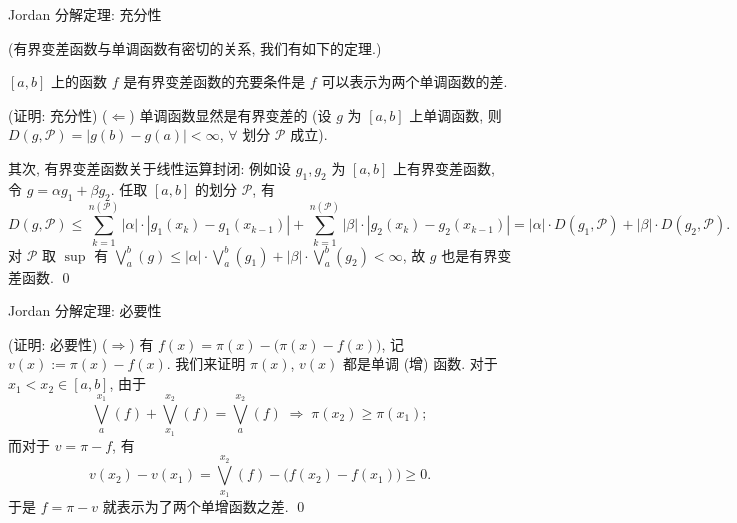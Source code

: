 \begin{frame}{Jordan 分解定理: 充分性}

(有界变差函数与单调函数有密切的关系, 我们有如下的定理.)

\begin{thm}[Jordan 分解]
$[a, b]$ 上的函数 $f$ 是有界变差函数的\alert{充要条件}是 $f$ 可以表示为两个单调函数的差.
\end{thm}

\startproof[bg=yellow, fg=red](证明: 充分性)
($\Longleftarrow$) 单调函数显然是有界变差的 (设 $g$ 为 $[a, b]$ 上单调函数, 则
$D(g, \mathscr{P}) = |g(b) - g(a)| < \infty$, $\forall$ 划分 $\mathscr{P}$ 成立).

其次, 有界变差函数关于线性运算封闭: 例如设 $g_1, g_2$ 为 $[a, b]$ 上有界变差函数,
令 $g = \alpha g_1 + \beta g_2$. 任取 $[a, b]$ 的划分 $\mathscr{P}$, 有
\[
D(g, \mathscr{P})
\leqslant \sum_{k=1}^{n(\mathscr{P})} |\alpha| \cdot
|g_1(x_k) - g_1(x_{k-1})|
+ \sum_{k=1}^{n(\mathscr{P})} |\beta| \cdot
|g_2(x_k) - g_2(x_{k-1})|
= |\alpha| \cdot D(g_1, \mathscr{P}) + |\beta| \cdot D(g_2, \mathscr{P}) .
\]
对 $\mathscr{P}$ 取 $\sup$ 有
$\bigvee_a^b (g) \leqslant |\alpha| \cdot \bigvee_a^b (g_1) + |\beta| \cdot \bigvee_a^b (g_2) < \infty$,
故 $g$ 也是有界变差函数.
\qed

\end{frame}


\begin{frame}{Jordan 分解定理: 必要性}

\startproof[bg=yellow, fg=red](证明: 必要性)
($\Longrightarrow$) 有
$f(x) = \pi(x) - \big( \pi(x) - f(x) \big)$, 记 $v(x) := \pi(x) - f(x)$.
我们来证明 $\pi(x)$, $v(x)$ 都是单调 (增) 函数. 对于 $x_1 < x_2 \in [a, b]$, 由于
\[
\bigvee_a^{x_1} (f) + \bigvee_{x_1}^{x_2} (f) = \bigvee_a^{x_2} (f)
\;\Longrightarrow\; \pi(x_2) \geqslant \pi(x_1) ;
\]
而对于 $v = \pi - f$, 有
\[
v(x_2) - v(x_1)
= \bigvee_{x_1}^{x_2} (f) - \big( f(x_2) - f(x_1) \big) \geqslant 0 .
\]
于是 $f = \pi - v$ 就表示为了两个单增函数之差.
\qed

\end{frame}


